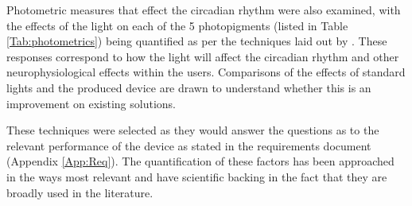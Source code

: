 Photometric measures that effect the circadian rhythm were also examined, with the effects of the light on each of the 5 photopigments (listed in Table \ref{Tab:photometrics}) being quantified as per the techniques laid out by \citet{lucasMeasuringUsingLight2014}. These responses correspond to how the light will affect the circadian rhythm and other neurophysiological effects within the users. Comparisons of the effects of standard lights and the produced device are drawn to understand whether this is an improvement on existing solutions.

These techniques were selected as they would answer the questions as to the relevant performance of the device as stated in the requirements document (Appendix \ref{App:Req}). The quantification of these factors has been approached in the ways most relevant and have scientific backing in the fact that they are broadly used in the literature.